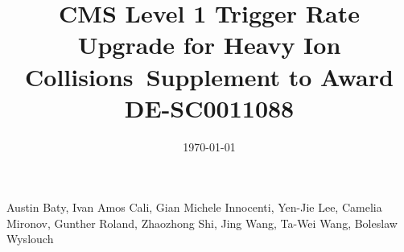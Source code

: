 \begin{titlepage}
\vspace{-.2 cm} 
\date{\today}
\vspace{2 cm}
\title{CMS Level 1 Trigger Rate Upgrade for Heavy Ion Collisions\ Supplement to Award DE-SC0011088 }

\vspace{.2 cm} 
\begin{Authlist}
Austin Baty\footnotemark[1], 
Ivan Amos Cali\footnotemark[1],
Gian Michele Innocenti\footnotemark[1], 
Yen-Jie Lee\footnotemark[1], 
Camelia Mironov\footnotemark[1], 
Gunther Roland\footnotemark[1], 
Zhaozhong Shi\footnotemark[1], 
Jing Wang\footnotemark[1], 
Ta-Wei Wang\footnotemark[1], 
Boleslaw Wyslouch\footnotemark[1]
\end{Authlist}



\end{titlepage}





